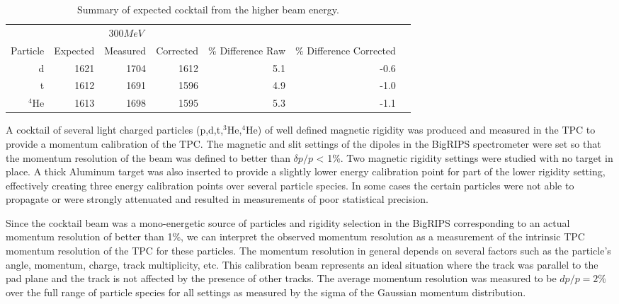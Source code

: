 \begin{table*}\centering
{}
\begin{tabular}{@{}rrrrrrr@{}}\toprule
& \multicolumn{3}{c}{$300 MeV$}\\
\cmidrule{2-4}
Particle & Expected & Measured & Corrected & \% Difference Raw & \% Difference Corrected\\
\midrule
d   & 1621 & 1704 & 1612   &  5.1 & -0.6  \\
t   & 1612 & 1691 & 1596   &  4.9  & -1.0\\
${}^{4}$He   & 1613 & 1698 &  1595 & 5.3 & -1.1\\

\bottomrule
\end{tabular}
\caption{Summary of expected cocktail from the higher beam energy.}
\label{tb:cocktail300}
\end{table*}

A cocktail of several light charged particles (p,d,t,${}^{3}$He,${}^{4}$He) of well defined magnetic rigidity was produced and measured in the TPC to provide a momentum calibration of the TPC. The magnetic and slit settings of the dipoles in the BigRIPS spectrometer were set so that the momentum resolution of the beam was defined to better than $\delta p/p$ < 1\%. Two magnetic rigidity settings were studied with no target in place. A thick Aluminum target was also inserted to provide a slightly lower energy calibration point for part of the lower rigidity setting, effectively creating three energy calibration points over several particle species. In some cases the certain particles were not able to propagate or were strongly attenuated and resulted in measurements of poor statistical precision. 

Since the cocktail beam was a mono-energetic source of particles and rigidity selection in the BigRIPS corresponding to an actual momentum resolution of better than 1\%, we can interpret the  observed momentum resolution as a measurement of the intrinsic TPC momentum resolution of the TPC for these particles. The momentum resolution in general depends on several factors such as the particle's angle, momentum, charge, track multiplicity, etc. This calibration beam represents an ideal situation where the track was parallel to the pad plane and the track is not affected by the presence of other tracks. The average momentum resolution was measured to be $dp/p = 2\%$ over the full range of particle species for all settings as measured by the sigma of the Gaussian momentum distribution. 

